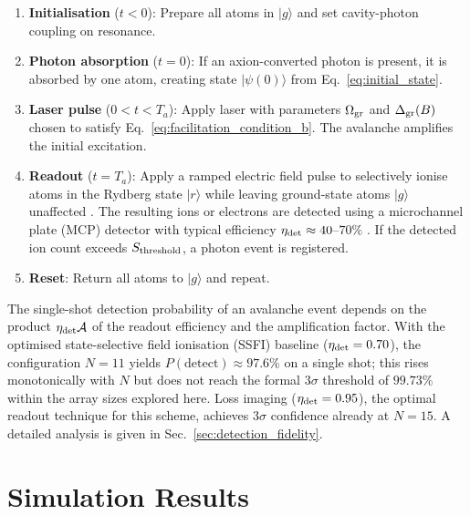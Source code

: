 \begin{enumerate}
    \item \textbf{Initialisation} ($t < 0$): Prepare all atoms in $|g\rangle$ and set cavity-photon coupling on resonance.

    \item \textbf{Photon absorption} ($t = 0$): If an axion-converted photon is present, it is absorbed by one atom, creating state $|\psi(0)\rangle$ from Eq.~\ref{eq:initial_state}.

    \item \textbf{Laser pulse} ($0 < t < T_a$): Apply laser with parameters $\Omega_{\rm gr}$ and $\Delta_{\rm gr}(B)$ chosen to satisfy Eq.~\ref{eq:facilitation_condition_b}. The avalanche amplifies the initial excitation.

    \item \textbf{Readout} ($t = T_a$): Apply a ramped electric field pulse to selectively ionise atoms in the Rydberg state $|r\rangle$ while leaving ground-state atoms $|g\rangle$ unaffected \cite{Gallagher2005, Zhang2024Review}. The resulting ions or electrons are detected using a microchannel plate (MCP) detector with typical efficiency $\eta_{\rm det} \approx 40$--$70\%$ \cite{Ryabtsev2007, Andersen2013}. If the detected ion count exceeds $S_{\rm threshold}$, a photon event is registered.

    \item \textbf{Reset}: Return all atoms to $|g\rangle$ and repeat.
\end{enumerate}

The single-shot detection probability of an avalanche event depends on the product $\eta_{\rm det}\mathcal{A}$ of the readout efficiency and the amplification factor. With the optimised state-selective field ionisation (SSFI) baseline ($\eta_{\rm det} = 0.70$), the configuration $N = 11$ yields $P(\text{detect}) \approx 97.6\%$ on a single shot; this rises monotonically with $N$ but does not reach the formal $3\sigma$ threshold of $99.73\%$ within the array sizes explored here. Loss imaging ($\eta_{\rm det} = 0.95$), the optimal readout technique for this scheme, achieves $3\sigma$ confidence already at $N = 15$. A detailed analysis is given in Sec.~\ref{sec:detection_fidelity}.
\section{Simulation Results}
\label{sec:axion_simulation_results}

